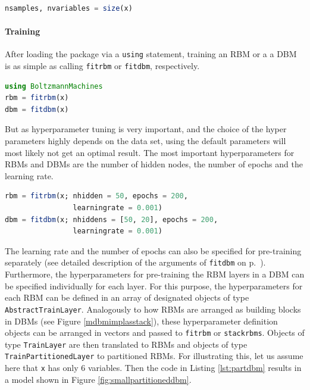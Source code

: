 \documentclass[12pt]{article}
\newcommand{\inlinecode}[1]{\texttt{#1}}
\begin{document}
\begin{lstlisting}[language=Julia]
nsamples, nvariables = size(x)
\end{lstlisting}

\paragraph{Training}\label{trainingimpl}

After loading the package via a \inlinecode{using} statement, training an RBM or a a DBM is as simple as calling \inlinecode{fitrbm} or \inlinecode{fitdbm}, respectively.

\begin{lstlisting}[language=Julia]
using BoltzmannMachines
rbm = fitrbm(x)
dbm = fitdbm(x)
\end{lstlisting}

But as hyperparameter tuning is very important, and the choice of the hyper parameters highly depends on the data set, using the default parameters will most likely not get an optimal result.
The most important hyperparameters for RBMs and DBMs are the number of hidden nodes, the number of epochs and the learning rate.

\begin{lstlisting}[language=Julia]
rbm = fitrbm(x; nhidden = 50, epochs = 200,
                learningrate = 0.001)
dbm = fitdbm(x; nhiddens = [50, 20], epochs = 200,
                learningrate = 0.001)
\end{lstlisting}

The learning rate and the number of epochs can also be specified for pre-training separately (see detailed description of the arguments of \inlinecode{fitdbm} on p.\ \pageref{bms_fitdbm}).
Furthermore, the hyperparameters for pre-training the RBM layers in a DBM can be specified individually for each layer.
For this purpose, the hyperparameters for each RBM can be defined in an array of designated objects of type \inlinecode{AbstractTrainLayer}.
Analogously to how RBMs are arranged as building blocks in DBMs (see Figure \ref{mdbmimplasstack}), these hyperparameter definition objects can be arranged in vectors and passed to \inlinecode{fitrbm} or \inlinecode{stackrbms}.
Objects of type \inlinecode{TrainLayer} are then translated to RBMs and objects of type \inlinecode{TrainPartitionedLayer} to partitioned RBMs.
For illustrating this, let us assume here that \inlinecode{x} has only 6 variables.
Then the code in Listing \ref{lst:partdbm} results in a model shown in Figure \ref{fig:smallpartitioneddbm}.
\end{document}
